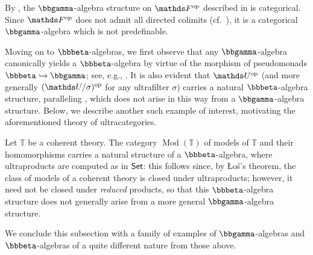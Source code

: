 \begin{rmk}\label{rmk:Fop-is-categorical}
    By , the $\bbgamma$-algebra structure on $\FF^{\op}$ described in  is categorical. Since $\FF^{\op}$ does not admit all directed colimits (cf.\ \cite[Ex.\ 12]{blassTwoClosedCategories1977}), it is a categorical $\bbgamma$-algebra which is not predefinable.
\end{rmk}

Moving on to $\bbbeta$-algebras, we first observe that any $\bbgamma$-algebra canonically yields a $\bbbeta$-algebra by virtue of the morphism of pseudomonads $\bbbeta \hookrightarrow \bbgamma$; see, e.g., \cite[Lem.\ 3.1]{gambinoFormalTheoryPseudomonads2021}. It is also evident that $\UF^{\op}$ (and more generally $(\UF/\sigma)^{\op}$ for any ultrafilter $\sigma$) carries a natural $\bbbeta$-algebra structure, paralleling , which does not arise in this way from a $\bbgamma$-algebra structure. Below, we describe another such example of interest, motivating the aforementioned theory of ultracategories.

\begin{ex}\label{ex:first-order-theories}
    Let $\mathbb T$ be a coherent theory. The category $\operatorname{Mod}(\mathbb T)$ of models of $\mathbb T$ and their homomorphisms carries a natural structure of a $\bbbeta$-algebra, where ultraproducts are computed as in $\mathsf{Set}$: this follows since, by \L o\'s's theorem, the class of models of a coherent theory is closed under ultraproducts; however, it need not be closed under \emph{reduced} products, so that this $\bbbeta$-algebra structure does not generally arise from a more general $\bbgamma$-algebra structure. 
\end{ex}

We conclude this subsection with a family of examples of $\bbgamma$-algebras and $\bbbeta$-algebras of a quite different nature from those above.


